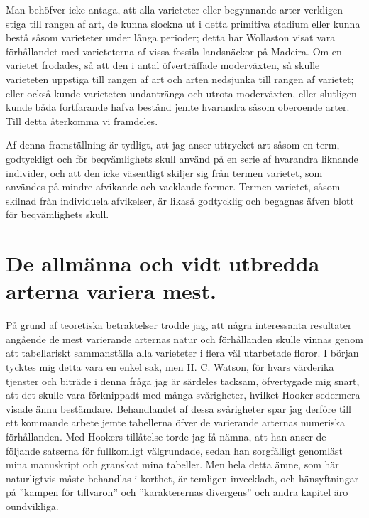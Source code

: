 Man behöfver icke antaga, att alla varieteter eller begynnande arter verkligen stiga till rangen af art, de kunna slockna ut i detta primitiva stadium eller kunna bestå såsom varieteter under långa perioder; detta har Wollaston visat vara förhållandet med varieteterna af vissa fossila landsnäckor på Madeira. Om en varietet frodades, så att den i antal öfverträffade moderväxten, så skulle varieteten uppstiga till rangen af art och arten nedsjunka till rangen af varietet; eller också kunde varieteten undantränga och utrota moderväxten, eller slutligen kunde båda fortfarande hafva bestånd jemte hvarandra såsom oberoende arter. Till detta återkomma vi framdeles.

Af denna framställning är tydligt, att jag anser uttrycket art såsom en term, godtyckligt och för beqvämlighets skull använd på en serie af hvarandra liknande individer, och att den icke väsentligt skiljer sig från termen varietet, som användes på mindre afvikande och vacklande former. Termen varietet, såsom skilnad från individuela afvikelser, är likaså godtycklig och begagnas äfven blott för beqvämlighets skull.



\section[Vidt utbredda arter variera mest]{De allmänna och vidt utbredda arterna variera mest.}

På grund af teoretiska betraktelser trodde jag, att några interessanta resultater angående de mest varierande arternas natur och förhållanden skulle vinnas genom att tabellariskt sammanställa alla varieteter i flera väl utarbetade floror. I början tycktes mig detta vara en enkel sak, men H. C. Watson, för hvars värderika tjenster och biträde i denna fråga jag är särdeles tacksam, öfvertygade mig snart, att det skulle vara förknippadt med många svårigheter, hvilket Hooker sedermera visade ännu bestämdare. Behandlandet af dessa svårigheter spar jag derföre till ett kommande arbete jemte tabellerna öfver de varierande arternas numeriska förhållanden. Med Hookers tillåtelse torde jag få nämna, att han anser de följande satserna för fullkomligt välgrundade, sedan han sorgfälligt genomläst mina manuskript och granskat mina tabeller. Men hela detta ämne, som här naturligtvis måste behandlas i korthet, är temligen inveckladt, och hänsyftningar på ”kampen för tillvaron” och ”karakterernas divergens” och andra kapitel äro oundvikliga.


